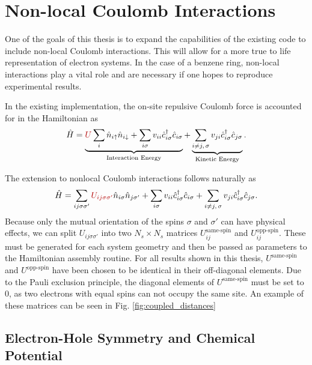 \section{Non-local Coulomb Interactions} \label{sec:non_local_coulomb}

One of the goals of this thesis is to expand the capabilities of the existing code to include non-local Coulomb interactions. This will allow for a more true to life representation of electron systems. In the case of a benzene ring, non-local interactions play a vital role and are necessary if one hopes to reproduce experimental results. 

\bigskip

In the existing implementation, the on-site repulsive Coulomb force is accounted for in the Hamiltonian as
\begin{equation}
    \hat{H}=\underbrace{{\color{red!70!black} U} \sum_{i} \hat{n}_{i \uparrow} \hat{n}_{i \downarrow} + \sum_{i\sigma} v_{ii} \hat{c}_{i \sigma}^{\dagger} \hat{c}_{i \sigma}}_{\text{Interaction Energy}}+%
    \underbrace{\sum_{{i\neq j,\, \sigma}} v_{j i} \hat{c}_{i \sigma}^{\dagger} \hat{c}_{j \sigma}}_{\text{Kinetic Energy}}\label{eq:local_ham_nonsym}.
\end{equation}

 The extension to nonlocal Coulomb interactions follows naturally as
 \begin{equation}
    \hat{H}= \sum_{ij\sigma\sigma'}{\color{red!70!black} U_{ij\sigma\sigma'}}\hat{n}_{i \sigma} \hat{n}_{j\sigma'}+\sum_{i\sigma} v_{ii} \hat{c}_{i \sigma}^{\dagger} \hat{c}_{i \sigma} + %
    \sum_{i\neq j,\,\sigma} v_{j i} \hat{c}_{i \sigma}^{\dagger} \hat{c}_{j \sigma}%
    \label{eq:ham_nonsym}.
\end{equation}
Because only the mutual orientation of the spins $\sigma$ and $\sigma'$ can have physical effects, we can split $U_{ij\sigma\sigma'}$ into two $N_s\times N_s$ matrices $U_{ij}^{\text{same-spin}}$ and $U_{ij}^{\text{opp-spin}}$. These must be generated for each system geometry and then be passed as parameters to the Hamiltonian assembly routine. For all results shown in this thesis, $U^{\text{same-spin}}$ and $U^{\text{opp-spin}}$ have been chosen to be identical in their off-diagonal elements. Due to the Pauli exclusion principle, the diagonal elements of $U^{\text{same-spin}}$ must be set to $0$, as two electrons with equal spins can not occupy the same site. An example of these matrices can be seen in Fig. \ref{fig:coupled_distances}


\subsection{Electron-Hole Symmetry and Chemical Potential} \label{sec:electron_hole_symmetry}
